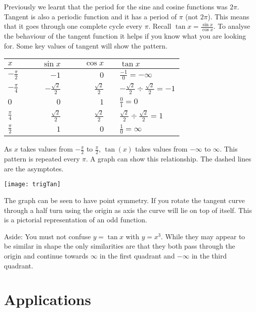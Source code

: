 Previously we learnt that the period for the sine and cosine functions was $2 \pi $. Tangent is also a periodic function and it has a period of $\pi $ (not $2 \pi $). This means that it goes through one complete cycle every $\pi$. Recall $\tan  x =\frac{\sin  x}{\cos  x}$. To analyse the behaviour of the tangent function it helps if you know what you are looking for. Some key values of tangent will show the pattern. 
\begin{center}
\begin{tabular}{lrrrl}\toprule
	$x$  & $\qquad\sin  x$  & $\qquad\cos  x$  &\qquad& $\tan  x$  \\
	\midrule
	$ -\frac{\pi }{2}$  & $ -1$  & $0$  && $\frac{ -1}{0} = -\infty $  \\
	\midrule
	$ -\frac{\pi }{4}$  & $ -\frac{\sqrt{2}}{2}$  & $\frac{\sqrt{2}}{2}$  && $ -\frac{\sqrt{2}}{2} \div \frac{\sqrt{2}}{2} = -1$  \\
	\midrule
	$0$  & $0$  & $1$  && $\frac{0}{1} =0$  \\
	\midrule
	$\frac{\pi }{4}$  & $\frac{\sqrt{2}}{2}$  & $\frac{\sqrt{2}}{2}$  && $\frac{\sqrt{2}}{2} \div \frac{\sqrt{2}}{2} =1$  \\
	\midrule
	$\frac{\pi }{2}$  & $1$  & $0$  && $\frac{1}{0} =\infty $  \\
	\bottomrule
\end{tabular}
\end{center}


As $x$ takes values from $ -\frac{\pi }{2}$ to $\frac{\pi }{2}$, $\tan(x)$ takes values from $ -\infty $ to $\infty $. This pattern is repeated every $\pi $. 
A \desmos graph can show this relationship. The dashed lines are the asymptotes.
\begin{center}
\texttt{[image: trigTan]}\end{center}
The graph can be seen to have point symmetry. If you rotate the tangent curve through a half turn using the origin as axis the curve will lie on top of itself. This is a pictorial representation of an odd function.

Aside: You must not confuse $y =\tan  x$ with $y =x^{3}$. While they may appear to be similar in shape the only similarities are that they both pass through the origin and continue towards $\infty $ in the first quadrant and $ -\infty $ in the third quadrant. 

\section{Applications}\label{sec:applications}
